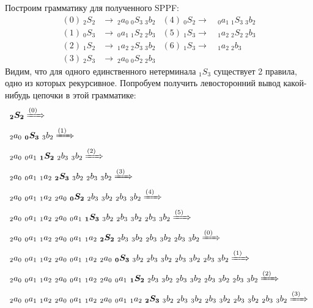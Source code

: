     \begin{example}
    Построим грамматику для полученного SPPF:
    \begin{align*}
        (0)\ _2S_2  & \to\ _2a_0\ _0S_3\ _3b_2   &(4)\ _0S_2 \to\ &_0a_1\ _1S_3\ _3b_2 \\ 
        (1)\ _0S_3  & \to\ _0a_1\ _1S_2\ _2b_3   &(5)\ _1S_3 \to\ &_1a_2\ _2S_2\ _2b_3 \\ 
        (2)\ _1S_2  & \to\ _1a_2\ _2S_3\ _3b_2   &(6)\ _1S_3 \to\ &_1a_2\ _2b_3 \\ 
        (3)\ _2S_3  & \to\ _2a_0\ _0S_2\ _2b_3   &
    \end{align*}
    Видим, что для одного единственного нетерминала $_1S_3$ существует 2 правила, одно из которых рекурсивное. Попробуем получить левосторонний вывод какой-нибудь цепочки в этой грамматике: 
    \begin{align*}
        & \boldsymbol{_2S_2} \xRightarrow{(0)\ } \\
        & {_2a_0}\ \boldsymbol{_0S_3}\ {_3b_2} \xRightarrow{(1)\ } \\
        & {_2a_0}\ {_0a_1}\ \boldsymbol{_1S_2}\ {_2b_3}\ {_3b_2} \xRightarrow{(2)\ } \\
        & {_2a_0}\ {_0a_1}\ {_1a_2}\ \boldsymbol{_2S_3}\ {_3b_2}\ {_2b_3}\ {_3b_2} \xRightarrow{(3)\ } \\
        & {_2a_0}\ {_0a_1}\ {_1a_2}\ {_2a_0}\ \boldsymbol{_0S_2}\ {_2b_3}\ {_3b_2}\ {_2b_3}\ {_3b_2} \xRightarrow{(4)\ } \\
        & {_2a_0}\ {_0a_1}\ {_1a_2}\ {_2a_0}\ {_0a_1}\ \boldsymbol{_1S_3}\ {_3b_2}\ {_2b_3}\ {_3b_2}\ {_2b_3}\ {_3b_2} \xRightarrow{(5)\ } \\
        & {_2a_0}\ {_0a_1}\ {_1a_2}\ {_2a_0}\ {_0a_1}\ {_1a_2}\ \boldsymbol{_2S_2}\ {_2b_3}\ {_3b_2}\ {_2b_3}\ {_3b_2}\ {_2b_3}\ {_3b_2} \xRightarrow{(0)\ } \\
        & {_2a_0}\ {_0a_1}\ {_1a_2}\ {_2a_0}\ {_0a_1}\ {_1a_2}\ {_2a_0}\ \boldsymbol{_0S_3}\ {_3b_2}\ {_2b_3}\ {_3b_2}\ {_2b_3}\ {_3b_2}\ {_2b_3}\ {_3b_2} \xRightarrow{(1)\ } \\
        & {_2a_0}\ {_0a_1}\ {_1a_2}\ {_2a_0}\ {_0a_1}\ {_1a_2}\ {_2a_0}\ {_0a_1}\ \boldsymbol{_1S_2}\ {_2b_3}\ {_3b_2}\ {_2b_3}\ {_3b_2}\ {_2b_3}\ {_3b_2}\ {_2b_3}\ {_3b_2} \xRightarrow{(2)\ } \\
        & {_2a_0}\ {_0a_1}\ {_1a_2}\ {_2a_0}\ {_0a_1}\ {_1a_2}\ {_2a_0}\ {_0a_1}\ {_1a_2}\ \boldsymbol{_2S_3}\ {_3b_2}\ {_2b_3}\ {_3b_2}\ {_2b_3}\ {_3b_2}\ {_2b_3}\ {_3b_2}\ {_2b_3}\ {_3b_2} \xRightarrow{(3)\ } \\

\end{align*}
\end{example}
